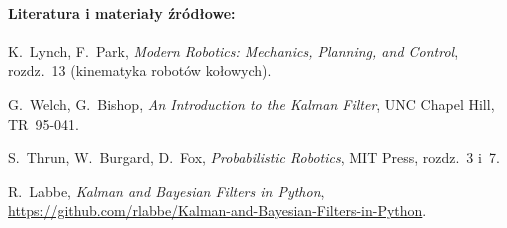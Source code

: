 \documentclass[10pt,a4paper]{article}
\begin{document}
\vspace{0.2cm}
\paragraph{Literatura i materiały źródłowe:}
\begin{enumerate}[label={[\arabic*]}, itemsep=1.5pt, topsep=2pt, parsep=0pt, leftmargin=1.5em]
    \small
    \item K.~Lynch, F.~Park, \emph{Modern Robotics: Mechanics, Planning, and Control}, rozdz.~13 (kinematyka robotów kołowych).
    \item G.~Welch, G.~Bishop, \emph{An Introduction to the Kalman Filter}, UNC Chapel Hill, TR~95-041.
    \item S.~Thrun, W.~Burgard, D.~Fox, \emph{Probabilistic Robotics}, MIT Press, rozdz.~3 i~7.
    \item R.~Labbe, \emph{Kalman and Bayesian Filters in Python}, \url{https://github.com/rlabbe/Kalman-and-Bayesian-Filters-in-Python}.
\end{enumerate}
\end{document}
